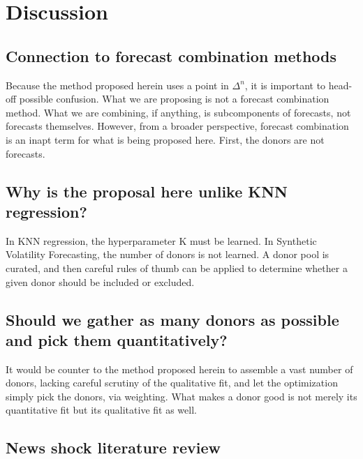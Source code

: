 \documentclass[11pt]{article}
\theoremstyle{definition}
\begin{document}
\section{Discussion}
\subsection{Connection to forecast combination methods}
Because the method proposed herein uses a point in $\Delta^{n}$, it is important to head-off possible confusion.  What we are proposing is not a forecast combination method.  What we are combining, if anything, is subcomponents of forecasts, not forecasts themselves.  However, from a broader perspective, forecast combination is an inapt term for what is being proposed here.  First, the donors are not forecasts. 
\subsection{Why is the proposal here unlike KNN regression?}
In KNN regression, the hyperparameter K must be learned.  In Synthetic Volatility Forecasting, the number of donors is not learned.  A donor pool is curated, and then careful rules of thumb can be applied to determine whether a given donor should be included or excluded. 

\subsection{Should we gather as many donors as possible and pick them quantitatively?}
It would be counter to the method proposed herein to assemble a vast number of donors, lacking careful scrutiny of the qualitative fit, and let the optimization simply pick the donors, via weighting.  What makes a donor good is not merely its quantitative fit but its qualitative fit as well.

\subsection{News shock literature review}

\end{document}

